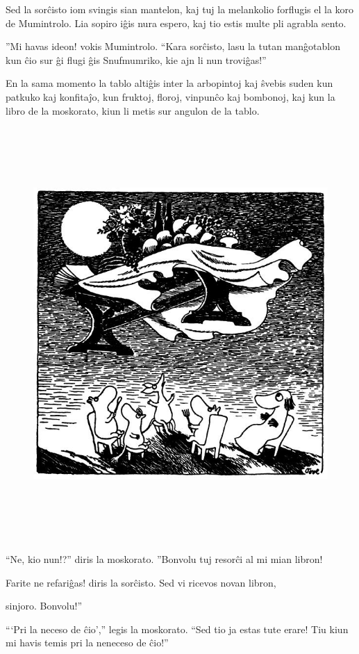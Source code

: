 Sed la sorĉisto iom svingis sian mantelon, kaj tuj la melankolio forflugis el la koro de Mumintrolo. Lia sopiro iĝis nura espero, kaj tio estis multe pli agrabla sento.

''Mi havas ideon! vokis Mumintrolo. ``Kara sorĉisto, lasu la tutan manĝotablon kun ĉio sur ĝi flugi ĝis Snufmumriko, kie ajn li nun troviĝas!''

En la sama momento la tablo altiĝis inter la arbopintoj kaj ŝvebis suden kun patkuko kaj konfitaĵo, kun fruktoj, floroj, vinpunĉo kaj bombonoj, kaj kun la libro de la moskorato, kiun li metis sur angulon de la tablo.

\begin{figure}[htbp]
\centering
\includegraphics[width=449pt,height=445pt]{_36.jpg}
\caption{}
\label{_36}
\end{figure}

``Ne, kio nun!?'' diris la moskorato. ''Bonvolu tuj resorĉi al mi mian libron!

Farite ne refariĝas! diris la sorĉisto. Sed vi ricevos novan libron,

sinjoro. Bonvolu!''

```Pri la neceso de ĉio','' legis la moskorato. ``Sed tio ja estas tute erare! Tiu kiun mi havis temis pri la neneceso de ĉio!''

